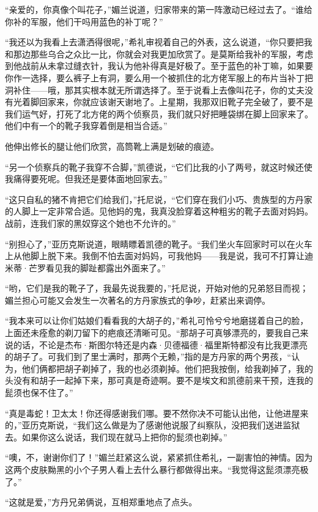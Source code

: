 \par “亲爱的，你真像个叫花子，”媚兰说道，归家带来的第一阵激动已经过去了。“谁给你补的军服，他们干吗用蓝色的补丁呢？”
\par “我还以为我看上去潇洒得很呢，”希礼审视着自己的外表，这么说道，“你只要把我和那边那些乌合之众比一比，你就会对我更加欣赏了。是莫斯给我补的军服，考虑到他战前从未拿过缝衣针，我认为他补得真是好极了。至于蓝色的补丁嘛，如果要你作一选择，要么裤子上有洞，要么用一个被抓住的北方佬军服上的布片当补丁把洞补住——哦，那其实根本就无所谓选择了。至于说看上去像叫花子，你的丈夫没有光着脚回家来，你就应该谢天谢地了。上星期，我那双旧靴子完全破了，要不是我们运气好，打死了北方佬的两个侦察员，我们就只好把睡袋绑在脚上回家来了。他们中有一个的靴子我穿着倒是相当合适。”
\par 他伸出修长的腿让他们欣赏，高筒靴上满是划破的痕迹。
\par “另一个侦察兵的靴子我穿不合脚，”凯德说，“它们比我的小了两号，就这时候还使我痛得要死呢。但我还是要体面地回家去。”
\par “这只自私的猪不肯把它们给我们，”托尼说，“它们穿在我们小巧、贵族型的方丹家的人脚上一定非常合适。见他妈的鬼，我真没脸穿着这种粗劣的靴子去面对妈妈。战前，连我们家的黑奴穿这个她也不允许的。”
\par “别担心了，”亚历克斯说道，眼睛瞟着凯德的靴子。“我们坐火车回家时可以在火车上从他脚上脱下来。我倒不怕去面对妈妈，可我他妈——我是说，我可不打算让迪米蒂·芒罗看见我的脚趾都露出外面来了。”
\par “哟，它们是我的靴子了，我最先说我要的，”托尼说，开始对他的兄弟怒目而视；媚兰担心可能又会发生一次著名的方丹家族式的争吵，赶紧出来调停。
\par “我本来可以让你们姑娘们看看我的大胡子的，”希礼可怜兮兮地磨搓着自己的脸，上面还未痊愈的剃刀留下的疤痕还清晰可见。“那胡子可真够漂亮的，要我自己来说的话，不论是杰布·斯图尔特还是内森·贝德福德·福里斯特都没有比我更漂亮的胡子了。可我们到了里士满时，那两个无赖，”指的是方丹家的两个男孩，“认为，他们俩都把胡子剃掉了，我的也必须剃掉。他们把我按倒，给我剃掉了，我的头没有和胡子一起掉下来，那可真是奇迹啊。要不是埃文和凯德前来干预，连我的髭须也保不住了。”
\par “真是毒蛇！卫太太！你还得感谢我们哪。要不然你决不可能认出他，让他进屋来的，”亚历克斯说，“我们这么做是为了感谢他说服了纠察队，没把我们送进监狱去。如果你这么说话，我们现在就马上把你的髭须也剃掉。”
\par “噢，不，谢谢你们了！”媚兰赶紧这么说，紧紧抓住希礼，一副害怕的神情。因为这两个皮肤黝黑的小个子男人看上去什么暴行都做得出来。“我觉得这髭须漂亮极了。”
\par “这就是爱，”方丹兄弟俩说，互相郑重地点了点头。
